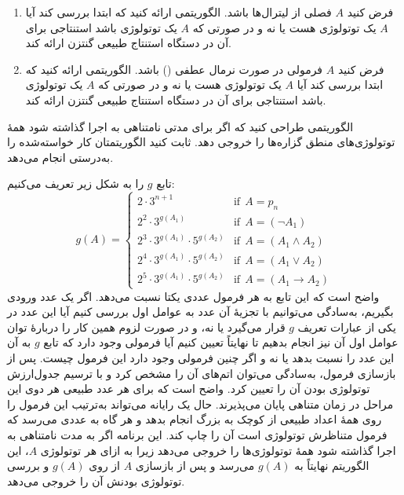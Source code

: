 \begin{enumerate}
  \item
  فرض کنید $A$ فصلی از لیترال‌ها باشد. الگوریتمی ارائه کنید که ابتدا بررسی کند آیا $A$ یک توتولوژی هست یا نه و در صورتی که $A$ یک توتولوژی باشد استنتاجی برای آن در دستگاه استنتاج طبیعی گنتزن ارائه کند.
  \item
  فرض کنید $A$ فرمولی در صورت نرمال عطفی () باشد. الگوریتمی ارائه کنید که ابتدا بررسی کند آیا $A$ یک توتولوژی هست یا نه و در صورتی که $A$ یک توتولوژی باشد استنتاجی برای آن در دستگاه استنتاج طبیعی گنتزن ارائه کند.
  \end{enumerate}
  
  \item
  الگوریتمی طراحی کنید که اگر برای مدتی نامتناهی به اجرا گذاشته شود همهٔ توتولوژی‌های منطق گزاره‌ها را خروجی دهد. ثابت کنید الگوریتمتان کار خواسته‌شده را به‌درستی انجام می‌دهد.
  \begin{ans}
  تابع $g$ را به شکل زیر تعریف می‌کنیم:
  $$
  g(A)=
  \begin{cases}
  2\cdot 3^{n+1} & \text{if}~~A = p_n\\
  2^2\cdot 3^{g(A_1)} & \text{if}~~A=(\neg A_1)\\
  2^3\cdot 3^{g(A_1)}\cdot 5^{g(A_2)} & \text{if}~~A=(A_1\wedge A_2) \\
  2^4\cdot 3^{g(A_1)}\cdot 5^{g(A_2)} & \text{if}~~A=(A_1\vee A_2) \\
  2^5\cdot 3^{g(A_1)}\cdot 5^{g(A_2)} & \text{if}~~A=(A_1\rightarrow A_2)
  \end{cases}
  $$
  واضح است که این تابع به هر فرمول عددی یکتا نسبت می‌دهد. اگر یک عدد ورودی بگیریم، به‌سادگی می‌توانیم با تجزیهٔ آن عدد به عوامل اول بررسی کنیم آیا این عدد در یکی از عبارات تعریف $g$ قرار می‌گیرد یا نه، و در صورت لزوم همین کار را دربارهٔ توان عوامل اول آن نیز انجام بدهیم تا نهایتاً تعیین کنیم آیا فرمولی وجود دارد که تابع $g$ به آن این عدد را نسبت بدهد یا نه و اگر چنین فرمولی وجود دارد این فرمول چیست. پس از بازسازی فرمول، به‌سادگی می‌توان اتم‌های آن را مشخص کرد و با ترسیم جدول‌ارزش توتولوژی بودن آن را تعیین کرد. واضح است که برای هر عدد طبیعی هر دوی این مراحل در زمان متناهی پایان می‌پذیرند. حال یک رایانه می‌تواند به‌ترتیب این فرمول را روی همهٔ اعداد طبیعی از کوچک به بزرگ انجام بدهد و هر گاه به عددی می‌رسد که فرمول متناظرش توتولوژی است آن را چاپ کند. این برنامه اگر به مدت نامتناهی به اجرا گذاشته شود همهٔ توتولوژی‌ها را خروجی می‌دهد زیرا به ازای هر توتولوژی $A$، این الگوریتم نهایتاً به
  $g(A)$
  می‌رسد و پس از بازسازی $A$ از روی $g(A)$ و بررسی توتولوژی بودنش آن را خروجی می‌دهد.
  \end{ans}
  